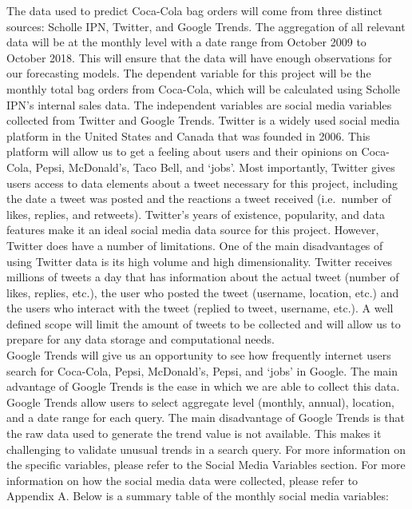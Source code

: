 \documentclass[12pt,oneside]{chicagocapstone}
\begin{document}
The data used to predict Coca-Cola bag orders will come from three distinct sources: Scholle IPN, Twitter, and Google Trends. The aggregation of all relevant data will be at the monthly level with a date range from October 2009 to October 2018. This will ensure that the data will have enough observations for our forecasting models. The dependent variable for this project will be the monthly total bag orders from Coca-Cola, which will be calculated using Scholle IPN's internal sales data. The independent variables are social media variables collected from Twitter and Google Trends.
Twitter is a widely used social media platform in the United States and Canada that was founded in 2006. This platform will allow us to get a feeling about users and their opinions on Coca-Cola, Pepsi, McDonald's, Taco Bell, and `jobs'. Most importantly, Twitter gives users access to data elements about a tweet necessary for this project, including the date a tweet was posted and the reactions a tweet received (i.e.~number of likes, replies, and retweets). Twitter's years of existence, popularity, and data features make it an ideal social media data source for this project. However, Twitter does have a number of limitations. One of the main disadvantages of using Twitter data is its high volume and high dimensionality. Twitter receives millions of tweets a day that has information about the actual tweet (number of likes, replies, etc.), the user who posted the tweet (username, location, etc.) and the users who interact with the tweet (replied to tweet, username, etc.). A well defined scope will limit the amount of tweets to be collected and will allow us to prepare for any data storage and computational needs.\\
Google Trends will give us an opportunity to see how frequently internet users search for Coca-Cola, Pepsi, McDonald's, Pepsi, and `jobs' in Google. The main advantage of Google Trends is the ease in which we are able to collect this data. Google Trends allow users to select aggregate level (monthly, annual), location, and a date range for each query. The main disadvantage of Google Trends is that the raw data used to generate the trend value is not available. This makes it challenging to validate unusual trends in a search query.
For more information on the specific variables, please refer to the Social Media Variables section. For more information on how the social media data were collected, please refer to Appendix A. Below is a summary table of the monthly social media variables:
\end{document}

